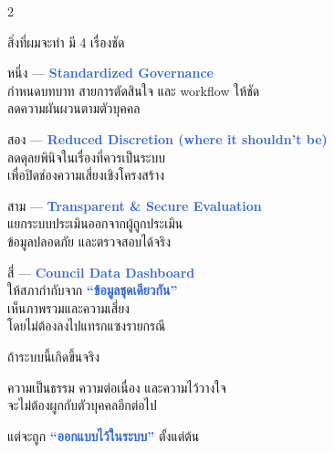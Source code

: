 \documentclass[10pt]{article}
\begin{document}
\begin{tcolorbox}[breakable,colback=panel,colframe=line,boxrule=0.5pt,arc=2mm,left=3mm,right=3mm,top=2mm,bottom=2mm]
\begin{multicols}{2}
\par สิ่งที่ผมจะทำ มี 4 เรื่องชัด
\par หนึ่ง — \textbf{\textcolor{highlight}{Standardized Governance}}\\ กำหนดบทบาท สายการตัดสินใจ และ workflow ให้ชัด\\ ลดความผันผวนตามตัวบุคคล
\par สอง — \textbf{\textcolor{highlight}{Reduced Discretion (where it shouldn’t be)}}\\ ลดดุลยพินิจในเรื่องที่ควรเป็นระบบ\\ เพื่อปิดช่องความเสี่ยงเชิงโครงสร้าง
\par สาม — \textbf{\textcolor{highlight}{Transparent \& Secure Evaluation}}\\ แยกระบบประเมินออกจากผู้ถูกประเมิน\\ ข้อมูลปลอดภัย และตรวจสอบได้จริง
\par สี่ — \textbf{\textcolor{highlight}{Council Data Dashboard}}\\ ให้สภากำกับจาก \textbf{\textcolor{highlight}{“ข้อมูลชุดเดียวกัน”}}\\ เห็นภาพรวมและความเสี่ยง\\ โดยไม่ต้องลงไปแทรกแซงรายกรณี
\par ถ้าระบบนี้เกิดขึ้นจริง
\par ความเป็นธรรม ความต่อเนื่อง และความไว้วางใจ\\ จะไม่ต้องผูกกับตัวบุคคลอีกต่อไป
\par แต่จะถูก \textbf{\textcolor{highlight}{“ออกแบบไว้ในระบบ”}} ตั้งแต่ต้น
\end{multicols}
\end{tcolorbox}

\clearpage
\end{document}
